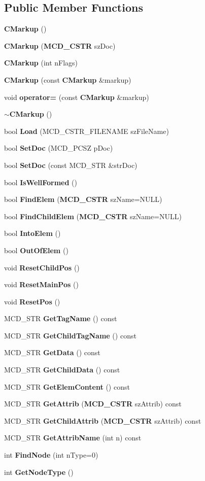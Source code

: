 \subsection*{Public Member Functions}
\begin{CompactItemize}
\item 
{\bf CMarkup} ()
\item 
{\bf CMarkup} ({\bf MCD\_\-CSTR} szDoc)
\item 
{\bf CMarkup} (int nFlags)
\item 
{\bf CMarkup} (const {\bf CMarkup} \&markup)
\item 
void {\bf operator=} (const {\bf CMarkup} \&markup)
\item 
{\bf $\sim$CMarkup} ()
\item 
bool {\bf Load} (MCD\_\-CSTR\_\-FILENAME szFileName)
\item 
bool {\bf SetDoc} (MCD\_\-PCSZ pDoc)
\item 
bool {\bf SetDoc} (const MCD\_\-STR \&strDoc)
\item 
bool {\bf IsWellFormed} ()
\item 
bool {\bf FindElem} ({\bf MCD\_\-CSTR} szName=NULL)
\item 
bool {\bf FindChildElem} ({\bf MCD\_\-CSTR} szName=NULL)
\item 
bool {\bf IntoElem} ()
\item 
bool {\bf OutOfElem} ()
\item 
void {\bf ResetChildPos} ()
\item 
void {\bf ResetMainPos} ()
\item 
void {\bf ResetPos} ()
\item 
MCD\_\-STR {\bf GetTagName} () const 
\item 
MCD\_\-STR {\bf GetChildTagName} () const 
\item 
MCD\_\-STR {\bf GetData} () const 
\item 
MCD\_\-STR {\bf GetChildData} () const 
\item 
MCD\_\-STR {\bf GetElemContent} () const 
\item 
MCD\_\-STR {\bf GetAttrib} ({\bf MCD\_\-CSTR} szAttrib) const 
\item 
MCD\_\-STR {\bf GetChildAttrib} ({\bf MCD\_\-CSTR} szAttrib) const 
\item 
MCD\_\-STR {\bf GetAttribName} (int n) const 
\item 
int {\bf FindNode} (int nType=0)
\item 
int {\bf GetNodeType} ()
\item 

\end{CompactItemize}
